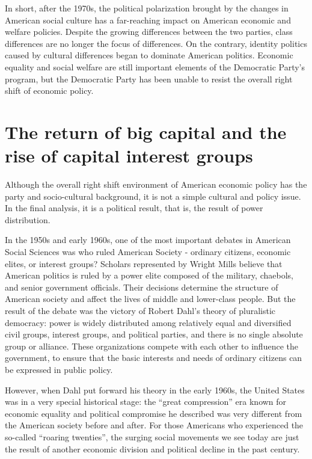 \documentclass[11pt]{article}
\begin{document}
In short, after the 1970s, the political polarization brought by the changes in American social culture has a far-reaching impact on American economic and welfare policies. Despite the growing differences between the two parties, class differences are no longer the focus of differences. On the contrary, identity politics caused by cultural differences began to dominate American politics. Economic equality and social welfare are still important elements of the Democratic Party's program, but the Democratic Party has been unable to resist the overall right shift of economic policy.

\section{The return of big capital and the rise of capital interest groups}

Although the overall right shift environment of American economic policy has the party and socio-cultural background, it is not a simple cultural and policy issue. In the final analysis, it is a political result, that is, the result of power distribution.

In the 1950s and early 1960s, one of the most important debates in American Social Sciences was who ruled American Society - ordinary citizens, economic elites, or interest groups? Scholars represented by Wright Mills believe that American politics is ruled by a power elite composed of the military, chaebols, and senior government officials. Their decisions determine the structure of American society and affect the lives of middle and lower-class people. But the result of the debate was the victory of Robert Dahl's theory of pluralistic democracy: power is widely distributed among relatively equal and diversified civil groups, interest groups, and political parties, and there is no single absolute group or alliance. These organizations compete with each other to influence the government, to ensure that the basic interests and needs of ordinary citizens can be expressed in public policy.

However, when Dahl put forward his theory in the early 1960s, the United States was in a very special historical stage: the “great compression” era known for economic equality and political compromise he described was very different from the American society before and after. For those Americans who experienced the so-called “roaring twenties”, the surging social movements we see today are just the result of another economic division and political decline in the past century.
\end{document}
